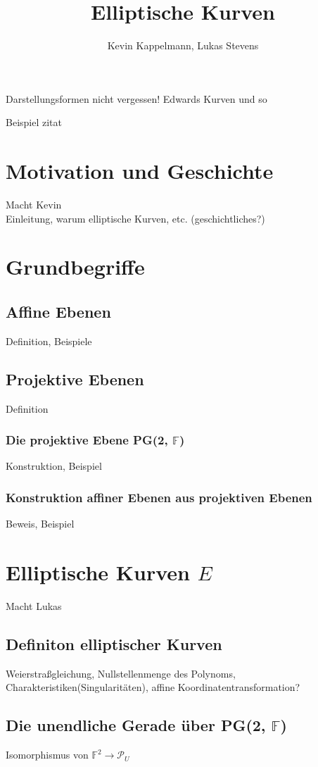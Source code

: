 \documentclass[hidelinks]{article}
\title{Elliptische Kurven}
\author{Kevin Kappelmann, Lukas Stevens}
\begin{document}
\maketitle
\newpage
\tableofcontents
\newpage

Darstellungsformen nicht vergessen! Edwards Kurven und so

Beispiel zitat
\cite[chapter, p.~215]{blablubb}

\section{Motivation und Geschichte}
Macht Kevin\\
Einleitung, warum elliptische Kurven, etc. (geschichtliches?)
\section{Grundbegriffe}
\subsection{Affine Ebenen}
Definition, Beispiele
\subsection{Projektive Ebenen}
Definition
\subsubsection{Die projektive Ebene PG(2, $\mathbb{F}$)}
Konstruktion, Beispiel
\subsubsection{Konstruktion affiner Ebenen aus projektiven Ebenen}
Beweis, Beispiel
\section{Elliptische Kurven $E$}
Macht Lukas\\
\subsection{Definiton elliptischer Kurven}
Weierstraßgleichung, Nullstellenmenge des Polynoms, Charakteristiken(Singularitäten), affine Koordinatentransformation?
\subsection{Die unendliche Gerade über PG(2, $\mathbb{F}$)}
Isomorphismus von $\mathbb{F}^2 \rightarrow \mathcal{P}_U$
\end{document}
